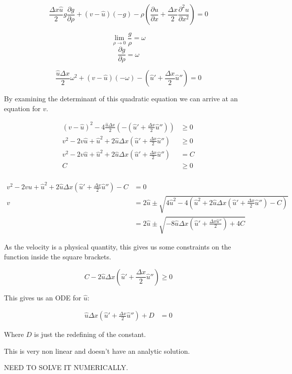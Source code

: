 \documentclass[a4paper]{article}
\begin{document}
\begin{equation}
\frac{\Delta x \hat{u}}{2} g \frac{\partial g}{\partial \rho} + ( v - \hat{u} ) (-g) - \rho \left( \frac{\partial u}{\partial x} + \frac{\Delta x}{2} \frac{\partial ^2 u}{\partial x ^2 } \right)  = 0 
\end{equation}

$$\lim _{\rho \rightarrow 0} \frac{g}{\rho} = \omega $$
$$ \frac{\partial g}{\partial \rho} = \omega $$

\begin{equation}
\frac{\hat{u} \Delta x }{2} \omega ^2 + ( v - \hat{u} ) ( - \omega ) - \left( \hat{u} ' + \frac{\Delta x}{2} \hat{u}'' \right) = 0 
\end{equation}

By examining the determinant of this quadratic equation we can arrive at an equation for $v$. 

\begin{align*}
(v - \hat{u} )^2 - 4 \frac{\hat{u} \Delta x}{2} \left( - \left( \hat{u} ' + \frac{\Delta x}{2} \hat{u}'' \right) \right) & \geq 0 \\
v ^2   - 2 v \hat{u} + \hat{u} ^2 + 2 \hat{u} \Delta x \left( \hat{u} ' + \frac{\Delta x}{2} \hat{u} '' \right) & \geq 0 \\
v ^2   - 2 v \hat{u} + \hat{u} ^2 + 2 \hat{u} \Delta x \left( \hat{u} ' + \frac{\Delta x}{2} \hat{u} '' \right) & = C \\
C &  \geq 0 \\
\end{align*}

\begin{align*}
v ^2   - 2 v \hat{u} + \hat{u} ^2 + 2 \hat{u} \Delta x \left( \hat{u} ' + \frac{\Delta x}{2} \hat{u} '' \right) - C & = 0 \\
v & = 2 \hat{u} \pm \sqrt{4 \hat{u} ^ 2 - 4 \left( \hat{u} ^2 + 2 \hat{u} \Delta x \left( \hat{u} ' + \frac{\Delta x}{2} \hat{u} '' \right) - C \right) }\\
&= 2 \hat{u} \pm \sqrt{-8 \hat{u} \Delta x \left( \hat{u} ' + \frac{\Delta x \hat{u} ''}{2 } \right) + 4 C}
\end{align*}

As the velocity is a physical quantity, this gives us some constraints on the function inside the square brackets. 


\begin{equation}
C - 2 \hat{u} \Delta x \left( \hat{u} ' + \frac{\Delta x}{2} \hat{u} '' \right)  \geq 0 
\end{equation}

This gives us an ODE for $\hat{u}$: 

\begin{align*}
\hat{u} \Delta x \left( \hat{u} ' + \frac{\Delta x }{2} \hat{u} '' \right) + D & = 0
\end{align*}

Where $D$ is just the redefining of the constant. 

This is very non linear and doesn't have an analytic solution. 

NEED TO SOLVE IT NUMERICALLY.
\end{document}
